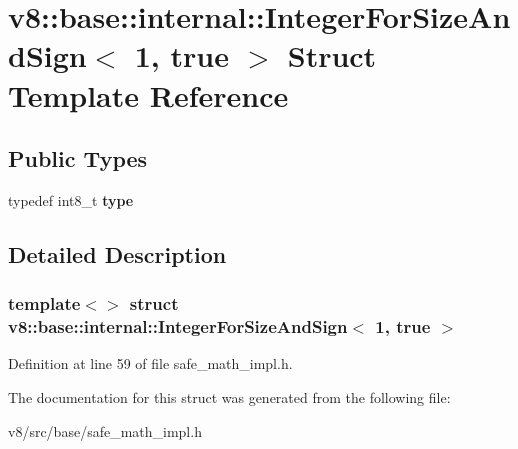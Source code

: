 \hypertarget{structv8_1_1base_1_1internal_1_1IntegerForSizeAndSign_3_011_00_01true_01_4}{}\section{v8\+:\+:base\+:\+:internal\+:\+:Integer\+For\+Size\+And\+Sign$<$ 1, true $>$ Struct Template Reference}
\label{structv8_1_1base_1_1internal_1_1IntegerForSizeAndSign_3_011_00_01true_01_4}
\subsection*{Public Types}
\begin{DoxyCompactItemize}
\item 
\mbox{\label{structv8_1_1base_1_1internal_1_1IntegerForSizeAndSign_3_011_00_01true_01_4_a144d8dc4a31cf1d301c5b005991d4a1d}} 
typedef int8\+\_\+t {\bfseries type}
\end{DoxyCompactItemize}


\subsection{Detailed Description}
\subsubsection*{template$<$$>$\newline
struct v8\+::base\+::internal\+::\+Integer\+For\+Size\+And\+Sign$<$ 1, true $>$}



Definition at line 59 of file safe\+\_\+math\+\_\+impl.\+h.



The documentation for this struct was generated from the following file\+:\begin{DoxyCompactItemize}
\item 
v8/src/base/safe\+\_\+math\+\_\+impl.\+h\end{DoxyCompactItemize}
